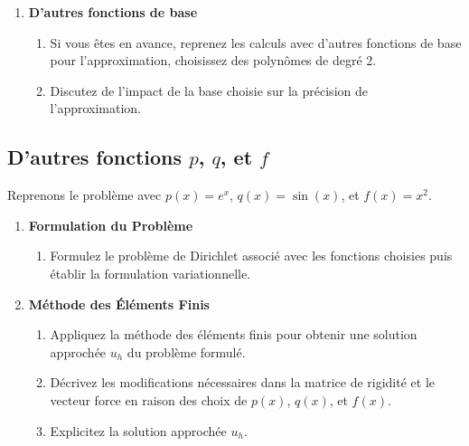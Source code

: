 \documentclass[a4paper,12pt]{article}
\begin{document}
\begin{enumerate}
    \item \textbf{D'autres fonctions de base}
    \begin{enumerate}
        \item Si vous êtes en avance, reprenez les calculs avec d'autres fonctions de base pour l'approximation, choisissez des polynômes de degré 2.
        
        \item Discutez de l'impact de la base choisie sur la précision de l'approximation.
        
        
    \end{enumerate}

\end{enumerate}

\subsection*{D'autres fonctions \( p \), \( q \), et \( f \)}

Reprenons le problème avec \( p(x) = e^x \), \( q(x) = \sin(x) \), et \( f(x) = x^2 \).

\begin{enumerate}

    \item \textbf{Formulation du Problème}
    \begin{enumerate}
        \item Formulez le problème de Dirichlet associé avec les fonctions choisies puis établir la formulation variationnelle.
    
    \end{enumerate}
    
    \item \textbf{Méthode des Éléments Finis}
    \begin{enumerate}
        \item Appliquez la méthode des éléments finis pour obtenir une solution approchée \( u_h \) du problème formulé.
        
        \item Décrivez les modifications nécessaires dans la matrice de rigidité et le vecteur force en raison des choix de \( p(x) \), \( q(x) \), et \( f(x) \).
        
        \item Explicitez la solution approchée \( u_h \).
        
        
    \end{enumerate}
    
\end{enumerate}
\end{document}
